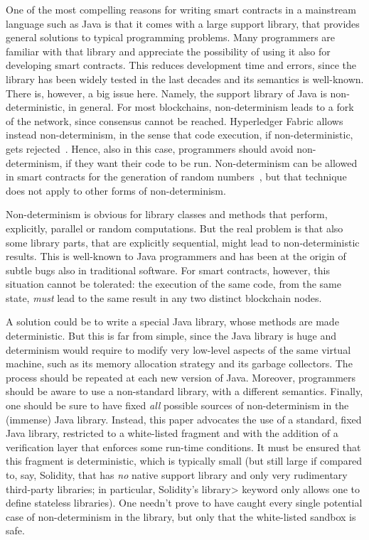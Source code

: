 One of the most compelling reasons for writing smart contracts
in a mainstream language such as Java is that it comes with a large
support library, that provides general solutions to typical programming problems.
Many programmers are familiar with that library and appreciate the possibility
of using it also for developing smart contracts. This reduces
development time and errors, since the library has been widely tested
in the last decades and its semantics is well-known. There is, however, a big
issue here. Namely, the support library of Java is non-deterministic, in general.
For most blockchains, non-determinism leads to a fork of the network, since
consensus cannot be reached. Hyperledger Fabric allows instead non-determinism,
in the sense that code execution, if non-deterministic, gets rejected~\cite{Vukolic17}.
Hence, also in this case, programmers should avoid non-determinism, if they want their code to be run.
Non-determinism can be allowed in smart contracts for the generation of random numbers~\cite{ChatterjeeGP19}, but that
technique does not apply to other forms of non-determinism.

Non-determinism is obvious for library classes and methods that perform, explicitly,
parallel or random computations. But the real problem is that
also some library parts, that are explicitly sequential, might lead to
non-deterministic results.
This is well-known to Java programmers and has been at the origin of subtle
bugs also in traditional software. For smart contracts, however,
this situation cannot be tolerated: the execution of the same code, from the same state,
\emph{must} lead to the same result in any two distinct blockchain nodes.

A solution could be to write a special Java library, whose
methods are made deterministic. But this is far from simple, since the Java library is huge
and determinism would require to modify very low-level aspects of the same virtual machine, such as
its memory allocation strategy and its garbage collectors.
The process should be repeated at each new version of Java.
Moreover, programmers should be aware to use a non-standard library, with a different semantics.
Finally, one should be sure to have fixed \emph{all} possible sources of non-determinism in the
(immense) Java library.
Instead, this paper advocates the use of a standard, fixed Java library, restricted to a white-listed
fragment and with the addition of a verification layer that enforces some run-time conditions.
It must be ensured that this fragment is deterministic, which is typically small (but still
large if compared to, say, Solidity, that has \emph{no} native support library and only very
rudimentary third-party libraries; in particular, Solidity's \<library> keyword
only allows one to define stateless libraries). One needn't prove
to have caught every single potential case of non-determinism in the library, but only that
the white-listed sandbox is safe.

